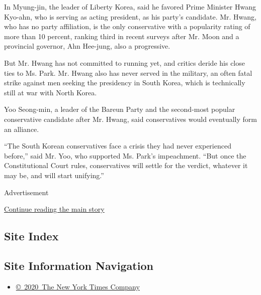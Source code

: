 In Myung-jin, the leader of Liberty Korea, said he favored Prime
Minister Hwang Kyo-ahn, who is serving as acting president, as his
party's candidate. Mr. Hwang, who has no party affiliation, is the only
conservative with a popularity rating of more than 10 percent, ranking
third in recent surveys after Mr. Moon and a provincial governor, Ahn
Hee-jung, also a progressive.

But Mr. Hwang has not committed to running yet, and critics deride his
close ties to Ms. Park. Mr. Hwang also has never served in the military,
an often fatal strike against men seeking the presidency in South Korea,
which is technically still at war with North Korea.

Yoo Seong-min, a leader of the Bareun Party and the second-most popular
conservative candidate after Mr. Hwang, said conservatives would
eventually form an alliance.

``The South Korean conservatives face a crisis they had never
experienced before,'' said Mr. Yoo, who supported Ms. Park's
impeachment. ``But once the Constitutional Court rules, conservatives
will settle for the verdict, whatever it may be, and will start
unifying.''

Advertisement

\protect\hyperlink{after-bottom}{Continue reading the main story}

\hypertarget{site-index}{%
\subsection{Site Index}\label{site-index}}

\hypertarget{site-information-navigation}{%
\subsection{Site Information
Navigation}\label{site-information-navigation}}

\begin{itemize}
\tightlist
\item
  \href{https://help.nytimes3xbfgragh.onion/hc/en-us/articles/115014792127-Copyright-notice}{©~2020~The
  New York Times Company}
\end{itemize}


